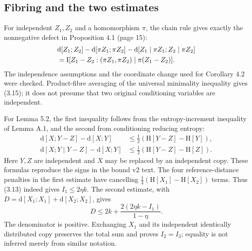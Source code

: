 \documentclass[10pt]{article}
\begin{document}
\subsection*{Fibring and the two estimates}
For independent \(Z_1,Z_2\) and a homomorphism \(\pi\), the chain rule gives exactly the nonnegative defect in Proposition 4.1 (page 15): \[\begin{aligned}
 &\mathrm d[Z_1;Z_2]-\mathrm d[\pi Z_1;\pi Z_2]
      -\mathrm d[Z_1\mid\pi Z_1;Z_2\mid\pi Z_2]\notag\\
 &=\mathrm I[Z_1-Z_2:(\pi Z_1,\pi Z_2)\mid\pi(Z_1-Z_2)].\end{aligned}\] The independence assumptions and the coordinate change used for Corollary 4.2 were checked. Product-fibre averaging of the universal minimality inequality gives (3.15); it does not presume that two original conditioning variables are independent.\par
For Lemma 5.2, the first inequality follows from the entropy-increment inequality of Lemma A.1, and the second from conditioning reducing entropy: \[\begin{aligned}
 \mathrm d[X;Y-Z]-\mathrm d[X;Y]&\le\tfrac12(\mathrm H[Y-Z]-\mathrm H[Y]),\\
 \mathrm d[X;Y\mid Y-Z]-\mathrm d[X;Y]&\le\tfrac12(\mathrm H[Y-Z]-\mathrm H[Z]).\end{aligned}\] Here \(Y,Z\) are independent and \(X\) may be replaced by an independent copy. These formulas reproduce the signs in the bound v2 text. The four reference-distance penalties in the first estimate have cancelling \(\tfrac14(\mathrm H[X_1]-\mathrm H[X_2])\) terms. Thus (3.13) indeed gives \(I_1\le2\eta k\). The second estimate, with \(D=\mathrm d[X_1;X_1]+\mathrm d[X_2;X_2]\), gives \[D\le2k+\frac{2(2\eta k-I_1)}{1-\eta}.\] The denominator is positive. Exchanging \(X_1\) and its independent identically distributed copy preserves the total sum and proves \(I_2=I_3\); equality is not inferred merely from similar notation.\par
\end{document}
